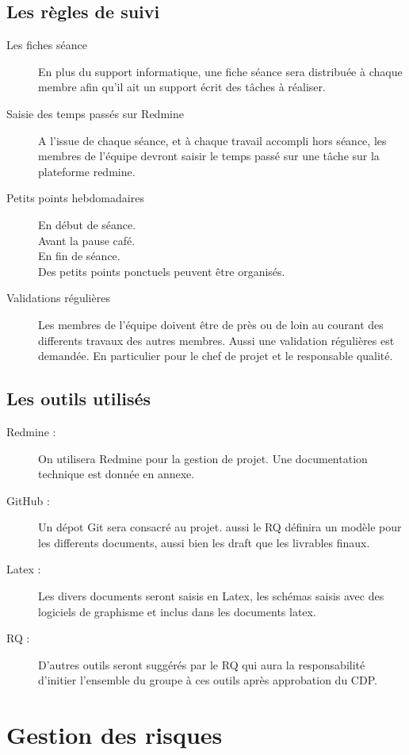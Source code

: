 \subsection{Les règles de suivi}
\begin{description}
\item[Les fiches séance]
En plus du support informatique, une fiche séance sera distribuée à chaque membre afin qu'il ait un support écrit des tâches à réaliser.
\item[Saisie des temps passés sur Redmine]
A l'issue de chaque séance, et à chaque travail accompli hors séance, les membres de l'équipe devront saisir le temps passé sur une tâche sur la plateforme redmine.
\item[Petits points hebdomadaires]
En début de séance.\\
Avant la pause café.\\
En fin de séance.\\
Des petits points ponctuels peuvent être organisés.\\
\item[Validations régulières]
Les membres de l'équipe doivent être de près ou de loin au courant des differents travaux des autres membres. Aussi une validation régulières est demandée. 
En particulier pour le chef de projet et le responsable qualité.
\end{description}
\subsection{Les outils utilisés}
\begin{description}
\item[Redmine :]
On utilisera Redmine pour la gestion de projet. Une documentation technique est donnée en annexe.
\item[GitHub :]
Un dépot Git sera consacré au projet. aussi le RQ définira un modèle pour les differents documents, aussi bien les draft que les livrables finaux.
\item[Latex :]
Les divers documents seront saisis en Latex, les schémas saisis avec des logiciels de graphisme et inclus dans les documents latex.
\item[RQ :]
D'autres outils seront suggérés par le RQ qui aura la responsabilité d'initier l'ensemble du groupe à ces outils après approbation du CDP.
\end{description}

\section{Gestion des risques}
